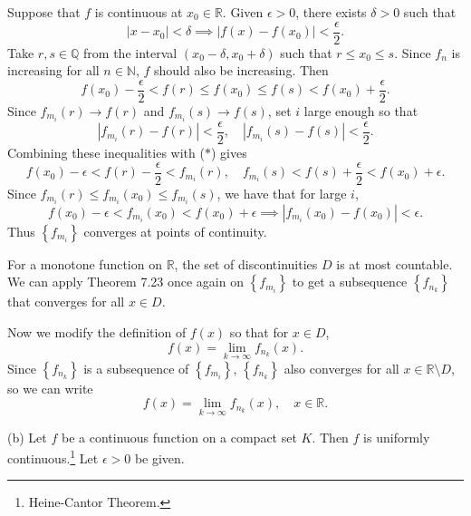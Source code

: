 \documentclass[12pt]{report}
\newcommand{\bs}{\setminus}
\newcommand{\abs}[1]{\left| #1 \right|}
\newcommand{\seq}[1]{\left\{ #1 \right\}}
\newcommand{\ra}{\rightarrow}
\newcommand{\mast}{\(\ast\)}
\newcommand{\R}{\mathbb{R}}
\newcommand{\N}{\mathbb{N}}
\newcommand{\Q}{\mathbb{Q}}
\begin{document}
\begin{enumerate}
    Suppose that \(f\) is continuous at \(x_0 \in \R\). Given \(\epsilon > 0\), there exists \(\delta > 0\) such that
    \[
        \abs{x - x_0} < \delta \implies \abs{f(x) - f(x_0)} < \frac{\epsilon}{2}.
    \]
    Take \(r, s \in \Q\) from the interval \((x_0 - \delta, x_0 + \delta)\) such that \(r \leq x_0 \leq s\). Since \(f_n\) is increasing for all \(n \in \N\), \(f\) should also be increasing. Then
    \[ \tag{\mast}
        f(x_0) -\frac{\epsilon}{2} < f(r) \leq f(x_0) \leq f(s) < f(x_0) + \frac{\epsilon}{2}.
    \]
    Since \(f_{m_i}(r) \ra f(r)\) and \(f_{m_i}(s) \ra f(s)\), set \(i\) large enough so that
    \[
        \abs{f_{m_i}(r) - f(r)} < \frac{\epsilon}{2}, \quad \abs{f_{m_i}(s) - f(s)} < \frac{\epsilon}{2}.
    \]
    Combining these inequalities with (\mast) gives
    \[
        f(x_0) - \epsilon < f(r) - \frac{\epsilon}{2} < f_{m_i}(r), \quad f_{m_i}(s) < f(s) + \frac{\epsilon}{2} < f(x_0) + \epsilon.
    \]
    Since \(f_{m_i}(r) \leq f_{m_i}(x_0) \leq f_{m_i}(s)\), we have that for large \(i\),
    \[
        f(x_0) - \epsilon < f_{m_i}(x_0) < f(x_0) + \epsilon \implies \abs{f_{m_i}(x_0) - f(x_0)} < \epsilon.
    \]
    Thus \(\seq{f_{m_i}}\) converges at points of continuity.

    For a monotone function on \(\R\), the set of discontinuities \(D\) is at most countable. We can apply {\sffamily Theorem 7.23} once again on \(\seq{f_{m_i}}\) to get a subsequence \(\seq{f_{n_k}}\) that converges for all \(x \in D\).

    Now we modify the definition of \(f(x)\) so that for \(x \in D\),
    \[
        f(x) = \lim_{k \ra\infty} f_{n_k}(x).
    \]
    Since \(\seq{f_{n_k}}\) is a subsequence of \(\seq{f_{m_i}}\), \(\seq{f_{n_k}}\) also converges for all \(x \in \R \bs D\), so we can write
    \[
        f(x) = \lim_{k \ra \infty} f_{n_k}(x), \quad x \in \R.
    \]

    {\sffamily (b)} Let \(f\) be a continuous function on a compact set \(K\). Then \(f\) is uniformly continuous.\footnote{Heine-Cantor Theorem.} Let \(\epsilon > 0\) be given.


\end{enumerate}
\end{document}

